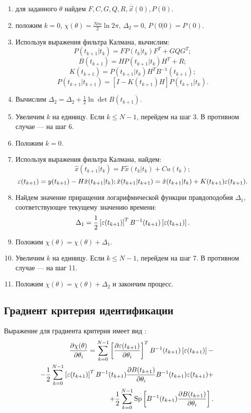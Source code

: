 \documentclass[a4paper,14pt]{extarticle}
\DeclareMathOperator{\Sp}{Sp}
\begin{document}
\begin{enumerate}
\item для заданного $\theta$  найдем $F, C, G, Q, R, \overline{\vec{x}}(0),
P(0)$.
\item положим $k = 0$, $\chi(\theta) = \frac{Nm}{2} \ln{2\pi}$, $\Delta_2 = 0$,
$P(0|0) = P(0)$.
\item Используя выражения фильтра Калмана, вычислим:
\[
	P(t_{k+1}|t_k) = F P(t_k|t_k) F^T + GQG^T;
\]
\[
	B(t_{k+1}) = H P(t_{k+1}|t_k) H^T + R;
\]
\[
	K(t_{k+1}) = P(t_{k+1}|t_k) H^T B^{-1}(t_{k+1});
\]
\[
	P(t_{k+1}|t_{k+1}) = \left[ I - K(t_{k+1}) H \right] P(t_{k+1}|t_k).
\]
\item Вычислим $\Delta_2 = \Delta_2 + \frac{1}{2} \ln \det B(t_{k+1})$.
\item Увеличим $k$ на единицу. Если $k \le N-1$, перейдем на шаг 3. В противном
случае --- на шаг 6.
\item Положим $k = 0$.
\item Используя выражения фильтра Калмана, найдем:
\[
	\hat{x}(t_{k+1}|t_k) = F \hat{x}(t_k|t_k) + C u(t_k);
\]
\[
	\varepsilon(t_{k+1}) = y(t_{k+1}) - H \hat{x} (t_{k+1}|t_k);
	\hat{x}(t_{k+1}|t_{k+1}) = \hat{x}(t_{k+1}|t_k) + K(t_{k+1}) \varepsilon(t_{k+1}).
\]
\item Найдем значение приращения логарифмической функции правдоподобия
$\Delta_1$, соответствующее текущему значению времени:
\[
	\Delta_1 = \frac{1}{2} \left[ \varepsilon(t_{k+1}) \right]^T B^{-1}(t_{k+1}) 
	\left[ \varepsilon(t_{k+1}) \right].
\]
\item Положим $\chi(\theta) = \chi(\theta) + \Delta_1$.
\item Увеличим $k$ на единицу. Если $k \le N-1$, перейдем на шаг 7.
В противном случае --- на шаг 11.
\item Положим $\chi(\theta) = \chi(\theta) + \Delta_2$ и закончим процесс.
\end{enumerate}

\subsection{Градиент критерия идентификации}

Выражение для градиента критерия имеет вид \cite{mono}:
\begin{equation*}
\begin{split}
	\frac{\partial \chi(\theta)}{\partial \theta_i} = \sum\limits_{k=0}^{N-1}
	\left[ \frac{\partial \eps(t_{k+1})}{\partial \theta_i} \right]^T
	B^{-1}(t_{k+1}) \left[ \eps(t_{k+1}) \right] - \\
	- \frac{1}{2}
	\sum\limits_{k=0}^{N-1} \left[ \eps(t_{k+1}) \right]^T B^{-1}(t_{k+1})
	\frac{\partial B(t_{k+1})}{\partial \theta_i} B^{-1}(t_{k+1}) \eps(t_{k+1}) +
	\\ + 
	\frac{1}{2} \sum\limits_{k=0}^{N-1} \Sp \left[ B^{-1}(t_{k+1})
	\frac{\partial B(t_{k+1})}{\partial \theta_i} \right]. 
\end{split}
\end{equation*}
\end{document}
